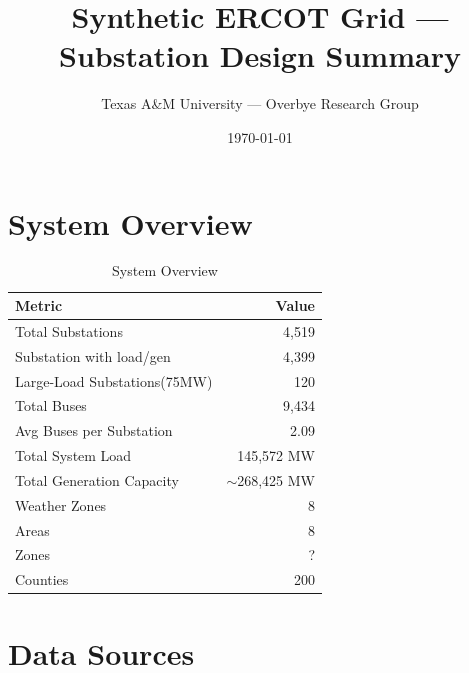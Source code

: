 \documentclass[11pt]{article}
\title{Synthetic ERCOT Grid --- Substation Design Summary}
\author{Texas A\&M University --- Overbye Research Group}
\date{\today}
\begin{document}
\maketitle

\section{System Overview}

\begin{table}[H]
\centering
\caption{System Overview}
\begin{tabular}{lr}
\toprule
\textbf{Metric} & \textbf{Value} \\
\midrule
Total Substations          & 4,519 \\
Substation with load/gen   & 4,399 \\
Large-Load Substations(\>75MW)     & 120 \\
Total Buses                & 9,434 \\
Avg Buses per Substation   & 2.09 \\
Total System Load          & 145,572 MW \\
Total Generation Capacity  & $\sim$268,425 MW \\
Weather Zones              & 8 \\
Areas                      & 8 \\
Zones                      & ? \\
Counties                   & 200 \\
\bottomrule
\end{tabular}
\end{table}



\section{Data Sources}
\end{document}
